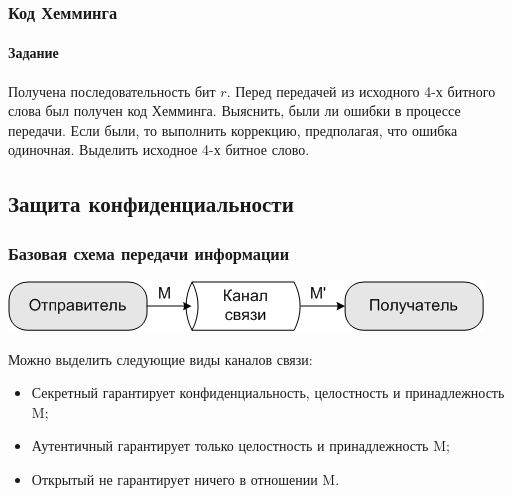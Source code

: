 \begin{frame}
    \frametitle{Код Хемминга}
    \framesubtitle{Задание}
    
    Получена последовательность бит $r$. Перед передачей из исходного 4-х битного слова был получен код Хемминга. Выяснить, были ли ошибки в процессе передачи. Если были, то выполнить коррекцию, предполагая, что ошибка одиночная. Выделить исходное 4-х битное слово.
    \begin{center}
    \end{center}
\end{frame}    


\subsection{Защита конфиденциальности}


\begin{frame}
    \frametitle{Базовая схема передачи информации}
    
    \begin{center}
        \includegraphics[width=.75\textwidth]{fig/basechannel} 
    \end{center}

    Можно выделить следующие виды \alert{каналов связи}:
    \begin{itemize}
        \item \alert{Секретный} гарантирует конфиденциальность, целостность и принадлежность M;
        \item \alert{Аутентичный} гарантирует только целостность и принадлежность M;
        \item \alert{Открытый} не гарантирует ничего в отношении M.
    \end{itemize}
\end{frame}

